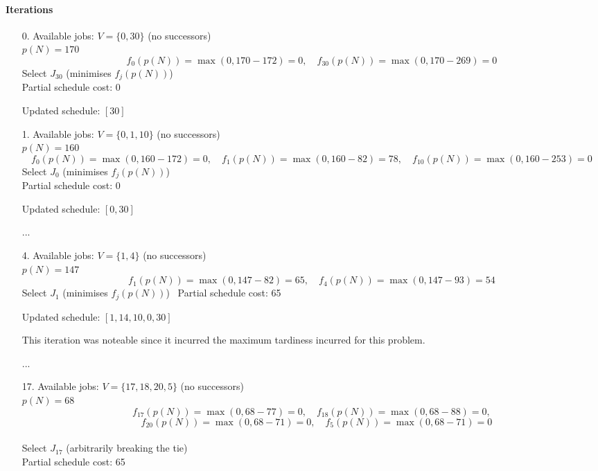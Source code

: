 \documentclass[fleqn]{article}
\begin{document}
    \paragraph{Iterations}
    \begin{enumerate}
      \item[0.] Available jobs: $V = \{ 0, 30 \}$ (no successors) \\
      $p(N) = 170$
      \[
      f_{0}(p(N)) = \max(0, 170 - 172) = 0, \quad f_{30}(p(N)) = \max(0, 170 - 269) = 0
      \]    
      Select $J_{30}$ (minimises $f_j(p(N))$) \\
      Partial schedule cost: 0

      Updated schedule: $[30]$
        

      \item[1.] Available jobs: $V = \{ 0, 1, 10 \}$ (no successors) \\
      $p(N) = 160$
      \[
      f_{0}(p(N)) = \max(0, 160 - 172) = 0, \quad f_{1}(p(N)) = \max(0, 160 - 82) = 78, \quad f_{10}(p(N)) = \max(0, 160 - 253) = 0
      \]    
      Select $J_{0}$ (minimises $f_j(p(N))$) \\
      Partial schedule cost: 0

      Updated schedule: $[0, 30]$

      \item[...]
        

      \item[4.] Available jobs: $V = \{ 1, 4 \}$ (no successors) \\
      $p(N) = 147$
      \[
      f_{1}(p(N)) = \max(0, 147 - 82) = 65, \quad f_{4}(p(N)) = \max(0, 147 - 93) = 54
      \]    
      Select $J_{1}$ (minimises $f_j(p(N))$) \
      Partial schedule cost: 65

      Updated schedule: $[1, 14, 10, 0, 30]$
      
      This iteration was noteable since it incurred the maximum tardiness incurred for this problem.

      \item[...]

      \item[17.] Available jobs: $V = \{ 17, 18, 20, 5 \}$ (no successors) \\
      $p(N) = 68$
      \[
      f_{17}(p(N)) = \max(0, 68 - 77) = 0, \quad f_{18}(p(N)) = \max(0, 68 - 88) = 0,
      \]
      \[
      \quad f_{20}(p(N)) = \max(0, 68 - 71) = 0, \quad f_{5}(p(N)) = \max(0, 68 - 71) = 0
      \] 
      \\   
      Select $J_{17}$ (arbitrarily breaking the tie) \\
      Partial schedule cost: 65


\end{enumerate}
\end{document}
